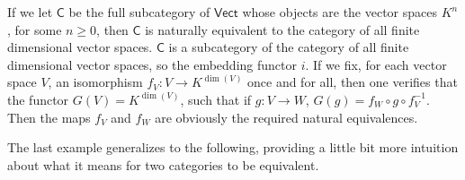 \begin{example}
    If we let $\mathsf{C}$ be the full subcategory of $\mathsf{Vect}$ whose objects are the vector spaces $K^n$, for some $n \geq 0$, then $\mathsf{C}$ is naturally equivalent to the category of all finite dimensional vector spaces. $\mathsf{C}$ is a subcategory of the category of all finite dimensional vector spaces, so the embedding functor $i$. If we fix, for each vector space $V$, an isomorphism $f_V: V \to K^{\dim(V)}$ once and for all, then one verifies that the functor $G(V) = K^{\dim(V)}$, such that if $g: V \to W$, $G(g) = f_W \circ g \circ f_V^{-1}$. Then the maps $f_V$ and $f_W$ are obviously the required natural equivalences.
\end{example}

The last example generalizes to the following, providing a little bit more intuition about what it means for two categories to be equivalent.

